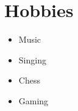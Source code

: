 \documentclass[a4paper, 14pt]{article}
\begin{document}
	\section*{Hobbies}
	\begin{itemize}
		\item Music
		\item Singing
		\item Chess
		\item Gaming
	\end{itemize}
	
	
\end{document}

